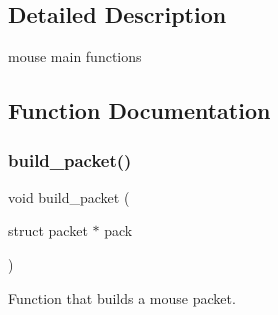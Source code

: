 \subsection{Detailed Description}
mouse main functions 

\subsection{Function Documentation}
\mbox{\label{group__mouse_ga7d38d68c1222c116e819346c1c3d36f1}} 
\subsubsection{\texorpdfstring{build\+\_\+packet()}{build\_packet()}}
{\footnotesize\ttfamily void build\+\_\+packet (\begin{DoxyParamCaption}\item[{struct packet $\ast$}]{pack }\end{DoxyParamCaption})}



Function that builds a mouse packet. 


